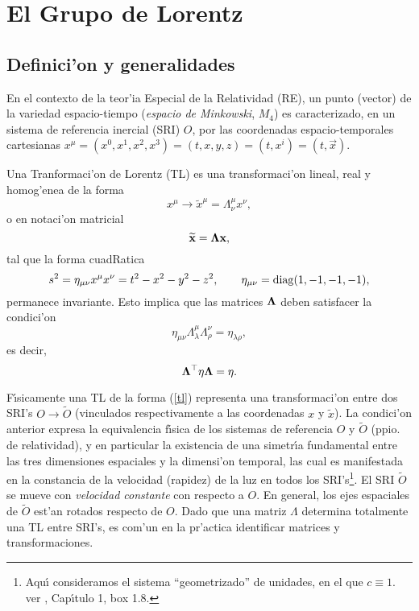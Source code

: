 \chapter{El Grupo de Lorentz}\label{appLor}
\section{Definici'on y generalidades}

En el contexto de la teor{'i}a Especial de la Relatividad (RE), un punto
(vector) de la variedad espacio-tiempo ({\em espacio de Minkowski}, $M_{4}$)
es caracterizado, en un sistema de referencia inercial (SRI) $O$, por las
coordenadas espacio-temporales cartesianas $x^{\mu
}=(x^0,x^1,x^2,x^3)=(t,x,y,z)=(t,x^{i})=(t,\vec{x})$.

Una Tranformaci'on de Lorentz (TL) es una transformaci'on lineal, real
y homog'enea de la forma 
\begin{equation}
x^{\mu }\rightarrow \widetilde{x}^{\mu }=\Lambda _{\nu }^{\mu }x^{\nu },
\label{tl}
\end{equation}
o en notaci'on matricial 
\begin{equation}
\widetilde{{\bf x}}={\bf \Lambda x,}
\end{equation}
tal que la forma cuadRatica 
\begin{equation}
s^2=\eta _{\mu \nu }x^{\mu }x^{\nu }=t^2-x^2-y^2-z^2,\qquad \eta
_{\mu \nu }={\rm diag}(1,-1,-1,-1),  \label{il}
\end{equation}
\newline
permanece invariante. Esto implica que las matrices ${\bf \Lambda }$ deben
satisfacer la condici'on 
\begin{equation}
\eta _{\mu \nu }\Lambda _{\lambda }^{\mu }\Lambda _{\rho }^{\nu }=\eta
_{\lambda \rho },  \label{indic}
\end{equation}
es decir, 
\begin{equation}
{\bf \Lambda }^{\top }{\bf \eta \Lambda =\eta }.  \label{condinv}
\end{equation}

F{\'{\i }}sicamente una TL de la forma (\ref{tl}) representa una
transformaci'on entre dos SRI's $O\rightarrow \widetilde{O}$ (vinculados
respectivamente a las coordenadas $x$ y $\widetilde{x}$). La condici'on
anterior expresa la equivalencia f{\'{\i }}sica de los sistemas de
referencia $O$ y $\widetilde{O}$ (ppio. de relatividad), y en particular la
existencia de una simetr{\'{\i }}a fundamental entre las tres dimensiones
espaciales y la dimensi'on temporal, las cual es manifestada en la
constancia de la velocidad (rapidez) de la luz en todos los SRI's\footnote{%
Aqu{\'{\i }} consideramos el sistema ``geometrizado'' de unidades, en el que 
$c\equiv 1$. ver \cite{MTW}, Cap{\'\i}tulo 1, box 1.8.}. El SRI $\widetilde{O%
}$ se mueve con {\em velocidad constante} con respecto a $O$. En general,
los ejes espaciales de $\widetilde{O}$ est'an rotados respecto de $O$.
Dado que una matriz $\Lambda $ determina totalmente una TL entre SRI's, es
com'un en la pr'actica identificar matrices y transformaciones.

